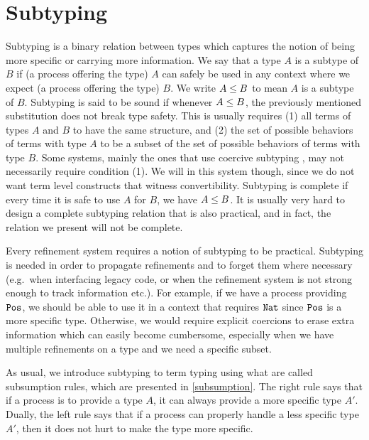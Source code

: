 
\section{Subtyping}

Subtyping is a binary relation between types which captures the notion of being more specific or carrying more information. We say that a type $A$ is a subtype of $B$ if (a process offering the type) $A$ can safely be used in any context where we expect (a process offering the type) $B$. We write $A \le B$ to mean $A$ is a subtype of $B$. Subtyping is said to be sound if whenever $A \le B$, the previously mentioned substitution does not break type safety. This is usually requires (1) all terms of types $A$ and $B$ to have the same structure, and (2) the set of possible behaviors of terms with type $A$ to be a subset of the set of possible behaviors of terms with type $B$. Some systems, mainly the ones that use coercive subtyping , may not necessarily require condition (1). We will in this system though, since we do not want term level constructs that witness convertibility. Subtyping is complete if every time it is safe to use $A$ for $B$, we have $A \le B$. It is usually very hard to design a complete subtyping relation that is also practical, and in fact, the relation we present will not be complete.

Every refinement system requires a notion of subtyping to be practical. Subtyping is needed in order to propagate refinements and to forget them where necessary (e.g.\ when interfacing legacy code, or when the refinement system is not strong enough to track information etc.). For example, if we have a process providing $\mathtt{Pos}$, we should be able to use it in a context that requires $\mathtt{Nat}$ since $\mathtt{Pos}$ is a more specific type. Otherwise, we would require explicit coercions to erase extra information which can easily become cumbersome, especially when we have multiple refinements on a type and we need a specific subset. 

As usual, we introduce subtyping to term typing using what are called subsumption rules, which are presented in \cref{subsumption}. The right rule says that if a process is to provide a type $A$, it can always provide a more specific type $A'$. Dually, the left rule says that if a process can properly handle a less specific type $A'$, then it does not hurt to make the type more specific.



